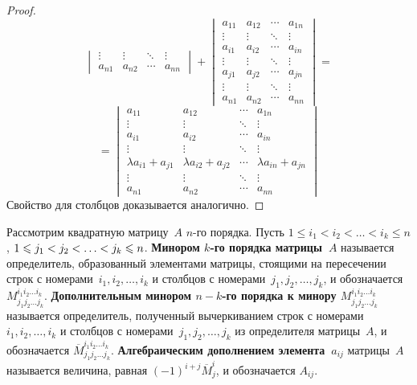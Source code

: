 \begin{itemize}
\begin{proof}
\begin{equation*}
\begin{vmatrix}
	\vdots & \vdots & \ddots & \vdots \\
	a_{n1} & a_{n2} & \cdots & a_{nn}
	\end{vmatrix} +
	\begin{vmatrix}
	a_{11} & a_{12} & \cdots & a_{1n} \\
	\vdots & \vdots & \ddots & \vdots \\
	a_{i1} & a_{i2} & \cdots & a_{in} \\
	\vdots & \vdots & \ddots & \vdots \\
	a_{j1} & a_{j2} & \cdots & a_{jn} \\
	\vdots & \vdots & \ddots & \vdots \\
	a_{n1} & a_{n2} & \cdots & a_{nn}
	\end{vmatrix} =
	\end{equation*}
	\begin{equation*}
	= \begin{vmatrix}
	a_{11} & a_{12} & \cdots & a_{1n} \\
	\vdots & \vdots & \ddots & \vdots \\
	a_{i1} & a_{i2} & \cdots & a_{in} \\
	\vdots & \vdots & \ddots & \vdots \\
	\lambda a_{i1} + a_{j1} & \lambda a_{i2} + a_{j2} & \cdots & \lambda a_{in} + a_{jn} \\
	\vdots & \vdots & \ddots & \vdots \\
	a_{n1} & a_{n2} & \cdots & a_{nn}
	\end{vmatrix}
	\end{equation*}
	Свойство для столбцов доказывается аналогично.
	\end{proof}
\end{itemize}

Рассмотрим квадратную матрицу~$A$ $n$-го порядка.
Пусть $1 \leqslant i_1 < i_2 < \ldots < i_k \leqslant n$, $1 \opbr\leqslant j_1 \opbr< j_2 \opbr< \ldots \opbr< j_k \opbr\leqslant n$.
 \textbf{Минором $k$-го порядка матрицы~$A$} называется определитель, образованный элементами матрицы, стоящими на пересечении строк с номерами~$i_1, i_2, \ldots, i_k$ и столбцов с номерами~$j_1, j_2, \ldots, j_k$, и обозначается~$M_{j_1 j_2 \ldots j_k}^{i_1 i_2 \ldots i_k}$.
\textbf{Дополнительным минором $n - k$-го порядка к минору $M_{j_1 j_2 \ldots j_k}^{i_1 i_2 \ldots i_k}$} называется определитель, полученный вычеркиванием строк с номерами~$i_1, i_2, \ldots, i_k$ и столбцов с номерами~$j_1, j_2, \ldots, j_k$ из определителя матрицы~$A$, и обозначается $\overline M_{j_1 j_2 \ldots j_k}^{i_1 i_2 \ldots i_k}$.
 \textbf{Алгебраическим дополнением элемента~$a_{ij}$} матрицы~$A$ называется величина, равная $(-1)^{i+j} \overline M_j^i$, и обозначается $A_{ij}$.

